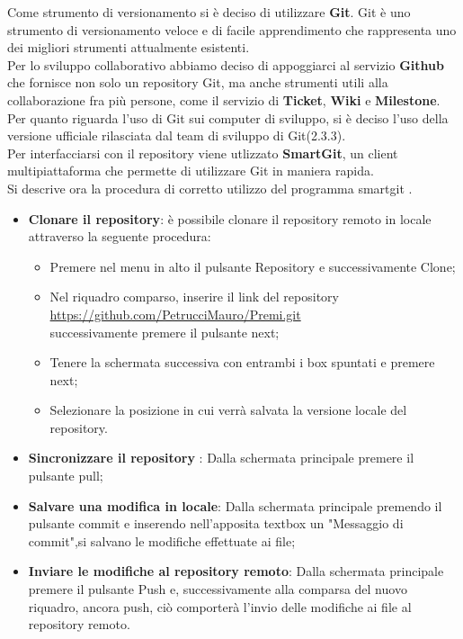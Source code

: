 Come strumento di versionamento si \`{e} deciso di utilizzare \textbf{Git}.
Git \`{e} uno strumento di versionamento veloce e di facile apprendimento che
rappresenta uno dei migliori strumenti attualmente esistenti.\\ Per lo sviluppo collaborativo abbiamo deciso di appoggiarci al servizio \textbf{Github} che fornisce non solo un repository Git, ma anche strumenti utili alla collaborazione fra pi\`{u} persone, come il servizio di \textbf{Ticket}, \textbf{Wiki} e \textbf{Milestone}.\\
Per quanto riguarda l’uso di Git sui computer di sviluppo, si \`{e} deciso l’uso
della versione ufficiale rilasciata dal team di sviluppo di Git(2.3.3).\\
Per interfacciarsi con il repository viene utlizzato \textbf{SmartGit}, un client multipiattaforma che permette di utilizzare Git in maniera rapida.\\
Si descrive ora la procedura di corretto utilizzo del programma smartgit .
\begin{itemize}

\item 	\textbf{Clonare il repository}: \`{e} possibile clonare il repository remoto in locale attraverso la seguente procedura:

\begin{itemize}
\item Premere nel menu in alto il pulsante Repository e successivamente Clone;
\item Nel riquadro comparso, inserire il link del repository\\ \url{https://github.com/PetrucciMauro/Premi.git}\\successivamente premere il pulsante  next;
\item Tenere la schermata successiva con entrambi i box spuntati e premere next;
\item Selezionare la posizione in cui verrà salvata la versione locale del repository.
\end{itemize}
\item \textbf{Sincronizzare il repository} : Dalla schermata principale premere il pulsante pull; 
\item \textbf{Salvare una modifica in locale}: Dalla schermata principale premendo il pulsante commit e inserendo nell'apposita textbox un "Messaggio di commit",si salvano le modifiche effettuate ai file;
\item \textbf{Inviare le modifiche al repository remoto}: Dalla schermata principale premere il pulsante Push e, successivamente alla comparsa del nuovo riquadro, ancora push, ci\`{o} comporter\`{a} l'invio delle modifiche ai file al repository remoto.

\end{itemize}

